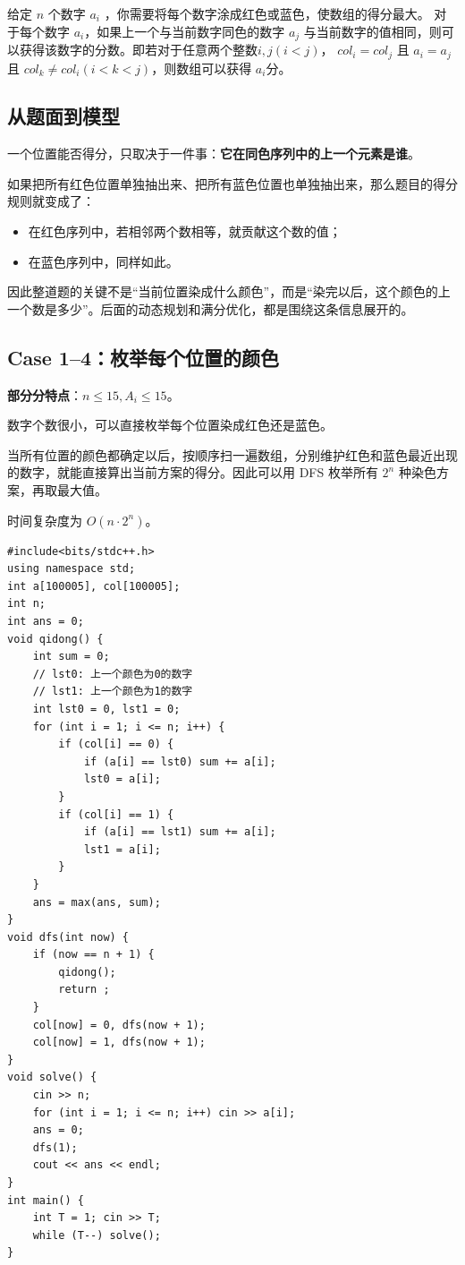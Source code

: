 \documentclass{book}
\begin{document}
    
    给定 $n$ 个数字 $a_i$ ，你需要将每个数字涂成红色或蓝色，使数组的得分最大。
    对于每个数字 $a_i$，如果上一个与当前数字同色的数字 $a_j$ 与当前数字的值相同，则可以获得该数字的分数。即若对于任意两个整数$i, j(i < j)$， $col_i = col_j$ 且 $a_i = a_j$ 且 $col_k \neq col_i (i < k < j) $，则数组可以获得 $a_i$分。

    \subsection{从题面到模型}

    一个位置能否得分，只取决于一件事：\textbf{它在同色序列中的上一个元素是谁}。

    如果把所有红色位置单独抽出来、把所有蓝色位置也单独抽出来，那么题目的得分规则就变成了：

    \begin{itemize}[leftmargin=2em,itemsep=1pt,topsep=2pt,parsep=0pt,partopsep=0pt]
        \item 在红色序列中，若相邻两个数相等，就贡献这个数的值；
        \item 在蓝色序列中，同样如此。
    \end{itemize}

    因此整道题的关键不是“当前位置染成什么颜色”，而是“染完以后，这个颜色的上一个数是多少”。后面的动态规划和满分优化，都是围绕这条信息展开的。

    
    \subsection{Case 1--4：枚举每个位置的颜色}

        \textbf{部分分特点}：$n\leq 15, A_i\leq 15$。

        数字个数很小，可以直接枚举每个位置染成红色还是蓝色。

        当所有位置的颜色都确定以后，按顺序扫一遍数组，分别维护红色和蓝色最近出现的数字，就能直接算出当前方案的得分。因此可以用 DFS 枚举所有 $2^n$ 种染色方案，再取最大值。

        时间复杂度为 $O(n \cdot 2^n)$。

        \newpage
        \begin{lstlisting}[style = code]
#include<bits/stdc++.h> 
using namespace std;
int a[100005], col[100005];
int n;
int ans = 0;
void qidong() {
    int sum = 0;
    // lst0: 上一个颜色为0的数字
    // lst1: 上一个颜色为1的数字
    int lst0 = 0, lst1 = 0;
    for (int i = 1; i <= n; i++) {
        if (col[i] == 0) {
            if (a[i] == lst0) sum += a[i];
            lst0 = a[i];
        }
        if (col[i] == 1) {
            if (a[i] == lst1) sum += a[i];
            lst1 = a[i];
        }
    }
    ans = max(ans, sum);
}
void dfs(int now) {
    if (now == n + 1) {
        qidong();
        return ;
    }
    col[now] = 0, dfs(now + 1);
    col[now] = 1, dfs(now + 1);
}
void solve() {
    cin >> n;
    for (int i = 1; i <= n; i++) cin >> a[i];
    ans = 0;
    dfs(1);
    cout << ans << endl;
}
int main() {
    int T = 1; cin >> T;
    while (T--) solve();
}\end{lstlisting}
        
\end{document}
